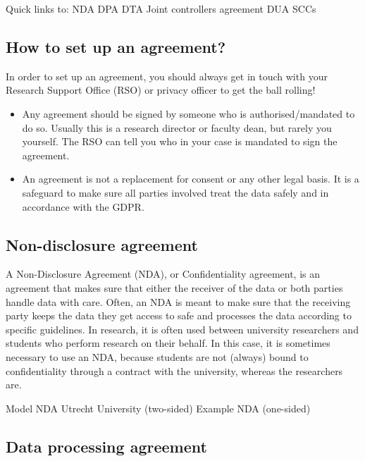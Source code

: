 \documentclass[
]{book}
\providecommand{\tightlist}{%
  \setlength{\itemsep}{0pt}\setlength{\parskip}{0pt}}
\begin{document}
Quick links to:
NDA
DPA
DTA
Joint controllers agreement
DUA
SCCs

\hypertarget{set-up-agreements}{%
\subsection{How to set up an agreement?}\label{set-up-agreements}}

In order to set up an agreement, you should always get in touch with your
Research Support Office
(RSO) or privacy officer
to get the ball rolling!

\begin{itemize}
\tightlist
\item
  Any agreement should be signed by someone who is authorised/mandated to do so.
  Usually this is a research director or faculty dean, but rarely you yourself.
  The RSO can tell you who in your case is mandated to sign the agreement.
\item
  An agreement is not a replacement for consent or any other
  legal basis. It is a safeguard to make sure all
  parties involved treat the data safely and in accordance with the GDPR.
\end{itemize}

\hypertarget{nda}{%
\subsection{Non-disclosure agreement}\label{nda}}

A Non-Disclosure Agreement (NDA), or Confidentiality agreement, is an agreement
that makes sure that either the receiver of the data or both parties handle
data with care. Often, an NDA is meant to make sure that the receiving party
keeps the data they get access to safe and processes the data according to
specific guidelines. In research, it is often used between university researchers
and students who perform research on their behalf. In this case, it is sometimes
necessary to use an NDA, because students are not (always) bound to
confidentiality through a contract with the university, whereas the researchers
are.

Model NDA Utrecht University (two-sided)
Example NDA (one-sided)

\hypertarget{data-processing-agreement}{%
\subsection{Data processing agreement}\label{data-processing-agreement}}
\end{document}
